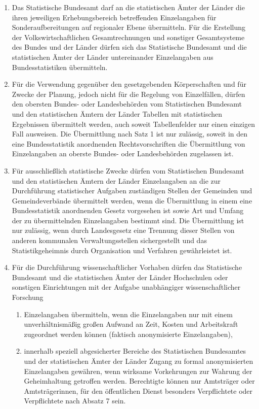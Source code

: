 \begin{enumerate}[label=(\arabic*)]
            \item Das Statistische Bundesamt darf an die statistischen Ämter der Länder die ihren jeweiligen Erhebungsbereich betreffenden Einzelangaben für Sonderaufbereitungen auf regionaler Ebene übermitteln. Für die Erstellung der Volkswirtschaftlichen Gesamtrechnungen und sonstiger Gesamtsysteme des Bundes und der Länder dürfen sich das Statistische Bundesamt und die statistischen Ämter der Länder untereinander Einzelangaben aus Bundesstatistiken übermitteln.
            \item Für die Verwendung gegenüber den gesetzgebenden Körperschaften und für Zwecke der Planung, jedoch nicht für die Regelung von Einzelfällen, dürfen den obersten Bundes- oder Landesbehörden vom Statistischen Bundesamt und den statistischen Ämtern der Länder Tabellen mit statistischen Ergebnissen übermittelt werden, auch soweit Tabellenfelder nur einen einzigen Fall ausweisen. Die Übermittlung nach Satz 1 ist nur zulässig, soweit in den eine Bundesstatistik anordnenden Rechtsvorschriften die Übermittlung von Einzelangaben an oberste Bundes- oder Landesbehörden zugelassen ist.
            \item Für ausschließlich statistische Zwecke dürfen vom Statistischen Bundesamt und den statistischen Ämtern der Länder Einzelangaben an die zur Durchführung statistischer Aufgaben zuständigen Stellen der Gemeinden und Gemeindeverbände übermittelt werden, wenn die Übermittlung in einem eine Bundesstatistik anordnenden Gesetz vorgesehen ist sowie Art und Umfang der zu übermittelnden Einzelangaben bestimmt sind. Die Übermittlung ist nur zulässig, wenn durch Landesgesetz eine Trennung dieser Stellen von anderen kommunalen Verwaltungsstellen sichergestellt und das Statistikgeheimnis durch Organisation und Verfahren gewährleistet ist. 
            \item Für die Durchführung wissenschaftlicher Vorhaben dürfen das Statistische Bundesamt und die statistischen Ämter der Länder Hochschulen oder sonstigen Einrichtungen mit der Aufgabe unabhängiger wissenschaftlicher Forschung
                \begin{enumerate}[label=\arabic*.]
                    \item Einzelangaben übermitteln, wenn die Einzelangaben nur mit einem un\-ver\-hält\-nis\-mäßig großen Aufwand an Zeit, Kosten und Arbeitskraft zugeordnet werden können (faktisch anonymisierte Einzelangaben),
                    \item innerhalb speziell abgesicherter Bereiche des Statistischen Bundesamtes und der statistischen Ämter der Länder Zugang zu formal anonymisierten Einzelangaben gewähren, wenn wirksame Vorkehrungen zur Wahrung der Geheimhaltung getroffen werden. Berechtigte können nur Amtsträger oder Amtsträgerinnen, für den öffentlichen Dienst besonders Verpflichtete oder Verpflichtete nach Absatz 7 sein.

\end{enumerate}
\end{enumerate}
